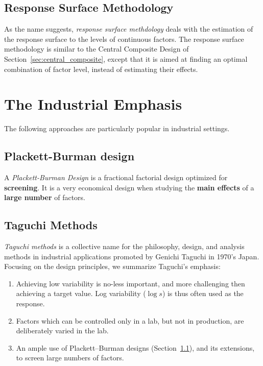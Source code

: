 \subsection{Response Surface Methodology}
\label{sec:response_surface}

As the name suggests, \emph{response surface methdology} deals with the estimation of the response surface to the levels of continuous factors.
The response surface methodology is similar to the Central Composite Design of Section~\ref{sec:central_composite}, except that it is aimed at finding an optimal combination of factor level, instead of estimating their effects. 








\section{The Industrial Emphasis}
The following approaches are particularly popular in industrial settings.

\subsection{Plackett-Burman design}
\label{sec:plackett_burman}

A \emph{Plackett-Burman Design} is a fractional factorial design optimized for \textbf{screening}. 
It is a very economical design when studying the \textbf{main effects} of a \textbf{large number} of factors. 



\subsection{Taguchi Methods}
\emph{Taguchi methods} is a collective name for the philosophy, design, and analysis methods in industrial applications promoted by Genichi Taguchi in 1970's Japan.
Focusing on the design principles, we summarize Taguchi's emphasis:

\begin{enumerate}

\item Achieving low variability is no-less important, and more challenging then achieving a target value. 
Log variability ($\log s$) is thus often used as the response.

\item Factors which can be controlled only in a lab, but not in production, are deliberately varied in the lab. 

\item An ample use of Plackett–Burman designs (Section~\ref{sec:plackett_burman}), and its extensions, to screen large numbers of factors. 

\end{enumerate}





